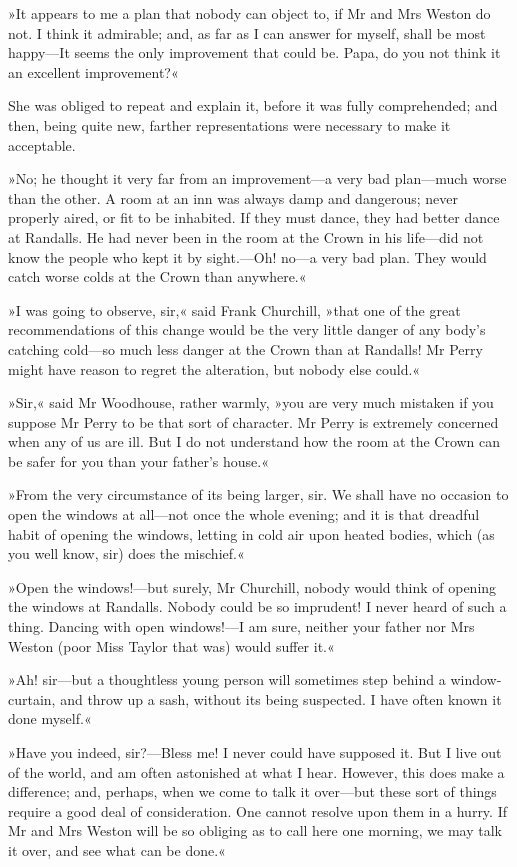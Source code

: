 »It appears to me a plan that nobody can object to, if Mr and Mrs Weston do not. I think it admirable; and, as far as I can answer for myself, shall be most happy—It seems the only improvement that could be. Papa, do you not think it an excellent improvement?«

She was obliged to repeat and explain it, before it was fully comprehended; and then, being quite new, farther representations were necessary to make it acceptable.

»No; he thought it very far from an improvement—a very bad plan—much worse than the other. A room at an inn was always damp and dangerous; never properly aired, or fit to be inhabited. If they must dance, they had better dance at Randalls. He had never been in the room at the Crown in his life—did not know the people who kept it by sight.—Oh! no—a very bad plan. They would catch worse colds at the Crown than anywhere.«

»I was going to observe, sir,« said Frank Churchill, »that one of the great recommendations of this change would be the very little danger of any body's catching cold—so much less danger at the Crown than at Randalls! Mr Perry might have reason to regret the alteration, but nobody else could.«

»Sir,« said Mr Woodhouse, rather warmly, »you are very much mistaken if you suppose Mr Perry to be that sort of character. Mr Perry is extremely concerned when any of us are ill. But I do not understand how the room at the Crown can be safer for you than your father's house.«

»From the very circumstance of its being larger, sir. We shall have no occasion to open the windows at all—not once the whole evening; and it is that dreadful habit of opening the windows, letting in cold air upon heated bodies, which (as you well know, sir) does the mischief.«

»Open the windows!—but surely, Mr Churchill, nobody would think of opening the windows at Randalls. Nobody could be so imprudent! I never heard of such a thing. Dancing with open windows!—I am sure, neither your father nor Mrs Weston (poor Miss Taylor that was) would suffer it.«

»Ah! sir—but a thoughtless young person will sometimes step behind a window-curtain, and throw up a sash, without its being suspected. I have often known it done myself.«

»Have you indeed, sir?—Bless me! I never could have supposed it. But I live out of the world, and am often astonished at what I hear. However, this does make a difference; and, perhaps, when we come to talk it over—but these sort of things require a good deal of consideration. One cannot resolve upon them in a hurry. If Mr and Mrs Weston will be so obliging as to call here one morning, we may talk it over, and see what can be done.«

